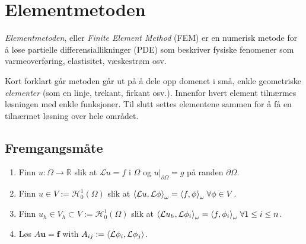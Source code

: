 \documentclass[../main.tex]{subfiles}
\begin{document}
\chapter{Elementmetoden}

\emph{Elementmetoden}, eller \emph{Finite Element Method} (FEM) er en numerisk metode for å løse partielle differensiallikninger (PDE) som beskriver fysiske fenomener som varmeoverføring, elastisitet, væskestrøm osv.

Kort forklart går metoden går ut på å dele opp domenet i små, enkle geometriske \emph{elementer} (som en linje, trekant, firkant osv.).
Innenfor hvert element tilnærmes løsningen med enkle funksjoner.
Til slutt settes elementene sammen for å få en tilnærmet løsning over hele området.

\section{Fremgangsmåte}
\begin{enumerate}
    \item Finn \(u: \Omega \rightarrow \mathbb{R}\) slik at \(\mathcal{L} u = f\) i \(\Omega\) og \(u\big|_{\partial\Omega} = g\) på randen \(\partial\Omega\).

    \item Finn \(u \in V := \mathcal{H}_0^1(\Omega)\) slik at \(\inner*{\mathcal{L} u,\mathcal{L} \phi}_\omega = \inner*{f, \phi}_\omega \; \forall \phi \in V\).

    \item Finn \(u_h \in V_h \subset V := \mathcal{H}_0^1(\Omega)\) slik at \(\inner*{\mathcal{L} u_h,\mathcal{L} \phi_i}_\omega = \inner*{f, \phi_i}_\omega \; \forall 1\leq i \leq n\).

    \item Løs \(A\symbf{u} = \symbf{f}\) with \(A_{ij} := \inner*{\mathcal{L} \phi_i, \mathcal{L} \phi_j}\).
\end{enumerate}
\end{document}
